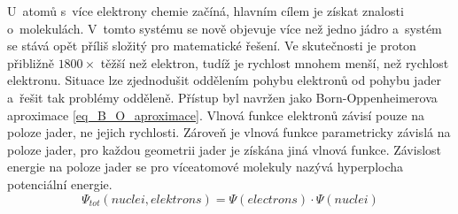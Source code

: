 \documentclass[
  printed, %
  table,   %
  lof,     %
  lot,     %
  oneside,
]{fithesis3}
\begin{document}
U~atomů s~více  elektrony chemie začíná, hlavním cílem je získat znalosti o~molekulách. V~tomto systému se nově objevuje více než jedno jádro a~systém se stává opět příliš složitý pro matematické řešení. Ve skutečnosti je proton přibližně $1800 \times$ těžší než elektron, tudíž je rychlost mnohem menší, než rychlost elektronu. Situace lze zjednodušit oddělením pohybu elektronů od pohybu jader a~řešit tak problémy odděleně. Přístup byl navržen jako Born-Oppenheimerova aproximace \ref{eq_B_O_aproximace}. Vlnová funkce elektronů závisí pouze na poloze jader, ne jejich rychlosti.\cite{lechamolecularmodeling} Zároveň je vlnová funkce parametricky závislá na poloze jader, pro každou geometrii jader je získána jiná vlnová funkce. Závislost energie na poloze jader se pro víceatomové molekuly nazývá hyperplocha potenciální energie.\cite{dftshrnutivysledky}
\begin{equation}
\Psi_{tot}(nuclei, elektrons) = \Psi(electrons) \cdot \Psi(nuclei)
\label{eq_B_O_aproximace} 
\end{equation}
\end{document}
